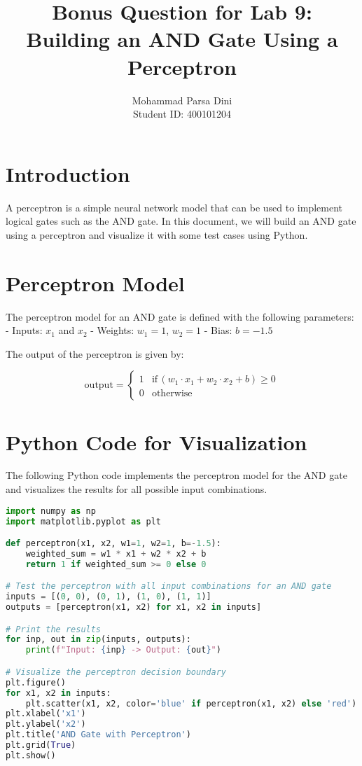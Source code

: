 \documentclass{article}
\begin{document}
\title{Bonus Question for Lab 9:  \\ Building an AND Gate Using a Perceptron}
\author{Mohammad Parsa Dini \\ Student ID: 400101204}
\date{}
\maketitle


\section*{Introduction}
A perceptron is a simple neural network model that can be used to implement logical gates such as the AND gate. In this document, we will build an AND gate using a perceptron and visualize it with some test cases using Python.

\section*{Perceptron Model}
The perceptron model for an AND gate is defined with the following parameters:
- Inputs: \(x_1\) and \(x_2\)
- Weights: \(w_1 = 1\), \(w_2 = 1\)
- Bias: \(b = -1.5\)

The output of the perceptron is given by:


\[
\text{output} = 
\begin{cases} 
1 & \text{if} \, (w_1 \cdot x_1 + w_2 \cdot x_2 + b) \geq 0 \\
0 & \text{otherwise}
\end{cases}
\]



\section*{Python Code for Visualization}
The following Python code implements the perceptron model for the AND gate and visualizes the results for all possible input combinations.

\begin{lstlisting}[language=Python, caption=Perceptron Implementation for AND Gate]
import numpy as np
import matplotlib.pyplot as plt

def perceptron(x1, x2, w1=1, w2=1, b=-1.5):
    weighted_sum = w1 * x1 + w2 * x2 + b
    return 1 if weighted_sum >= 0 else 0

# Test the perceptron with all input combinations for an AND gate
inputs = [(0, 0), (0, 1), (1, 0), (1, 1)]
outputs = [perceptron(x1, x2) for x1, x2 in inputs]

# Print the results
for inp, out in zip(inputs, outputs):
    print(f"Input: {inp} -> Output: {out}")

# Visualize the perceptron decision boundary
plt.figure()
for x1, x2 in inputs:
    plt.scatter(x1, x2, color='blue' if perceptron(x1, x2) else 'red')
plt.xlabel('x1')
plt.ylabel('x2')
plt.title('AND Gate with Perceptron')
plt.grid(True)
plt.show()
\end{lstlisting}
\end{document}

